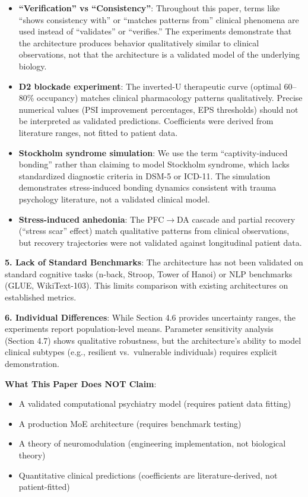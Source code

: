 \documentclass[preprint,12pt]{elsarticle}
\begin{document}
\begin{itemize}
\item \textbf{``Verification'' vs ``Consistency''}: Throughout this paper, terms like ``shows consistency with'' or ``matches patterns from'' clinical phenomena are used instead of ``validates'' or ``verifies.'' The experiments demonstrate that the architecture produces behavior qualitatively similar to clinical observations, not that the architecture is a validated model of the underlying biology.

\item \textbf{D2 blockade experiment}: The inverted-U therapeutic curve (optimal 60--80\% occupancy) matches clinical pharmacology patterns qualitatively. Precise numerical values (PSI improvement percentages, EPS thresholds) should not be interpreted as validated predictions. Coefficients were derived from literature ranges, not fitted to patient data.

\item \textbf{Stockholm syndrome simulation}: We use the term ``captivity-induced bonding'' rather than claiming to model Stockholm syndrome, which lacks standardized diagnostic criteria in DSM-5 or ICD-11. The simulation demonstrates stress-induced bonding dynamics consistent with trauma psychology literature, not a validated clinical model.

\item \textbf{Stress-induced anhedonia}: The PFC$\rightarrow$DA cascade and partial recovery (``stress scar'' effect) match qualitative patterns from clinical observations, but recovery trajectories were not validated against longitudinal patient data.
\end{itemize}

\textbf{5. Lack of Standard Benchmarks}: The architecture has not been validated on standard cognitive tasks (n-back, Stroop, Tower of Hanoi) or NLP benchmarks (GLUE, WikiText-103). This limits comparison with existing architectures on established metrics.

\textbf{6. Individual Differences}: While Section 4.6 provides uncertainty ranges, the experiments report population-level means. Parameter sensitivity analysis (Section 4.7) shows qualitative robustness, but the architecture's ability to model clinical subtypes (e.g., resilient vs.\ vulnerable individuals) requires explicit demonstration.

\textbf{What This Paper Does NOT Claim}:
\begin{itemize}
\item A validated computational psychiatry model (requires patient data fitting)
\item A production MoE architecture (requires benchmark testing)
\item A theory of neuromodulation (engineering implementation, not biological theory)
\item Quantitative clinical predictions (coefficients are literature-derived, not patient-fitted)
\end{itemize}
\end{document}
